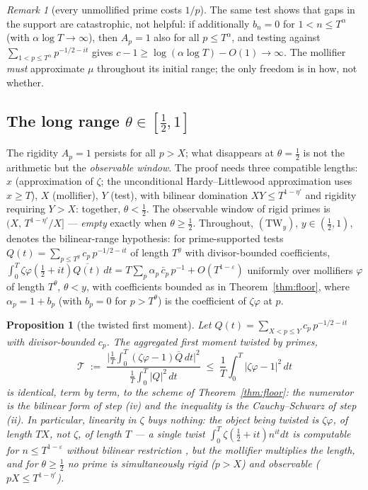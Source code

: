 \documentclass[11pt]{amsart}
\theoremstyle{plain}
\newtheorem{proposition}[theorem]{Proposition}
\theoremstyle{definition}
\theoremstyle{remark}
\newtheorem{remark}[theorem]{Remark}
\begin{document}
\begin{remark}[every unmollified prime costs $1/p$]\label{rem:noninitial}
The same test shows that gaps in the support are catastrophic, not helpful: if additionally $b_n=0$ for $1<n\le T^\alpha$ (with $\alpha\log T\to\infty$), then $A_p=1$ also for all $p\le T^\alpha$, and testing against $\sum_{1<p\le T^\alpha}p^{-1/2-it}$ gives $c-1\ge\log(\alpha\log T)-O(1)\to\infty$. The mollifier \emph{must} approximate $\mu$ throughout its initial range; the only freedom is in how, not whether.
\end{remark}

\subsection{The long range $\theta\in[\tfrac12,1]$}

The rigidity $A_p=1$ persists for all $p>X$; what disappears at $\theta=\tfrac12$ is not the arithmetic but the \emph{observable window}. The proof needs three compatible lengths: $x$ (approximation of $\zeta$; the unconditional Hardy--Littlewood approximation uses $x\ge T$), $X$ (mollifier), $Y$ (test), with bilinear domination $XY\le T^{1-\eta'}$ and rigidity requiring $Y>X$: together, $\theta<\tfrac12$. The observable window of rigid primes is $(X,\,T^{1-\eta'}/X]$ --- \emph{empty} exactly when $\theta\ge\tfrac12$. Throughout, $(\mathrm{TW}_y)$, $y\in(\tfrac12,1)$, denotes the bilinear-range hypothesis: for prime-supported tests $Q(t)=\sum_{p\le T^y}c_p\,p^{-1/2-it}$ of length $T^y$ with divisor-bounded coefficients, $\int_0^T\zeta\varphi(\tfrac12+it)\overline{Q(t)}\,dt=T\sum_p\alpha_p\,\bar c_p\,p^{-1}+O(T^{1-\varepsilon})$ uniformly over mollifiers $\varphi$ of length $T^\theta$, $\theta<y$, with coefficients bounded as in Theorem~\ref{thm:floor}, where $\alpha_p=1+b_p$ (with $b_p=0$ for $p>T^\theta$) is the coefficient of $\zeta\varphi$ at $p$.

\begin{proposition}[the twisted first moment]\label{prop:twisted}
Let $Q(t)=\sum_{X<p\le Y}c_p\,p^{-1/2-it}$ with divisor-bounded $c_p$. The aggregated first moment twisted by primes,
\[
\mathcal T\;:=\;\frac{\bigl|\frac1T\int_0^T(\zeta\varphi-1)\overline Q\,dt\bigr|^2}{\frac1T\int_0^T|Q|^2\,dt}\;\le\;\frac1T\int_0^T|\zeta\varphi-1|^2\,dt
\]
is identical, term by term, to the scheme of Theorem~\ref{thm:floor}: the numerator is the bilinear form of step \textup{(iv)} and the inequality is the Cauchy--Schwarz of step \textup{(ii)}. In particular, linearity in $\zeta$ buys nothing: the object being twisted is $\zeta\varphi$, of length $TX$, not $\zeta$, of length $T$ --- a single twist $\int_0^T\zeta(\tfrac12+it)n^{it}dt$ \emph{is} computable for $n\le T^{1-\varepsilon}$ without bilinear restriction \cite{Gonek1984}, but the mollifier multiplies the length, and for $\theta\ge\tfrac12$ no prime is simultaneously rigid \textup{(}$p>X$\textup{)} and observable \textup{(}$pX\le T^{1-\eta'}$\textup{)}.
\end{proposition}
\end{document}
